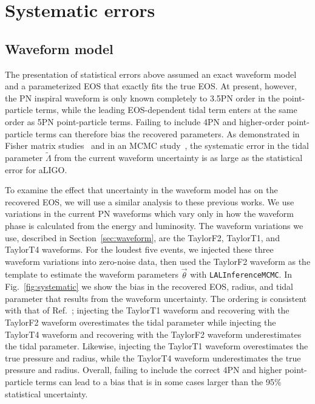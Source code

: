 \documentclass[twocolumn,prd,amssymb,aps,nofootinbib,showpacs,epsf]{revtex4}
\begin{document}
\section{Systematic errors}
\label{sec:systematic}

\subsection{Waveform model}

The presentation of statistical errors above assumed an exact waveform model and a parameterized EOS that exactly fits the true EOS. At present, however, the PN inspiral waveform is only known completely to 3.5PN order in the point-particle terms, while the leading EOS-dependent tidal term enters at the same order as 5PN point-particle terms. Failing to include 4PN and higher-order point-particle terms can therefore bias the recovered parameters. As demonstrated in Fisher matrix studies~\cite{Favata2014, YagiYunes2014} and in an MCMC study~\cite{WadeCreightonOchsner2014}, the systematic error in the tidal parameter $\tilde\Lambda$ from the current waveform uncertainty is as large as the statistical error for aLIGO. 

To examine the effect that uncertainty in the waveform model has on the recovered EOS, we will use a similar analysis to these previous works. We use variations in the current PN waveforms which vary only in how the waveform phase is calculated from the energy and luminosity. The waveform variations we use, described in Section~\ref{sec:waveform}, are the TaylorF2, TaylorT1, and TaylorT4 waveforms. For the loudest five events, we injected these three waveform variations into zero-noise data, then used the TaylorF2 waveform as the template to estimate the waveform parameters $\vec\theta$ with \texttt{LALInferenceMCMC}. In Fig.~\ref{fig:systematic} we show the bias in the recovered EOS, radius, and tidal parameter that results from the waveform uncertainty. The ordering is consistent with that of Ref.~\cite{WadeCreightonOchsner2014}; injecting the TaylorT1 waveform and recovering with the TaylorF2 waveform overestimates the tidal parameter while injecting the TaylorT4 waveform and recovering with the TaylorF2 waveform underestimates the tidal parameter. Likewise, injecting the TaylorT1 waveform overestimates the true pressure and radius, while the TaylorT4 waveform underestimates the true pressure and radius. Overall, failing to include the correct 4PN and higher point-particle terms can lead to a bias that is in some cases larger than the 95\% statistical uncertainty.
\end{document}
